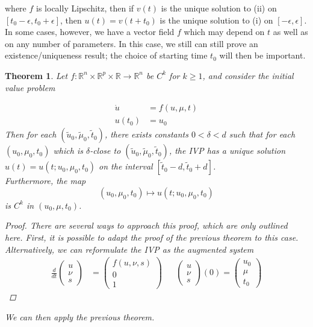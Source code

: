 \documentclass{article}
\newtheorem{theorem}{Theorem}[section]
\def\R{{\mathbb R}}
\begin{document}
where $f$ is locally Lipschitz, then if $v(t)$ is the unique solution to (ii) on $[t_0 - \epsilon, t_0 + \epsilon]$, then $u(t) = v(t+t_0)$ is the unique solution to (i) on $[-\epsilon, \epsilon]$.\\

In some cases, however, we have a vector field $f$ which may depend on $t$ as well as on any number of parameters. In this case, we still can still prove an existence/uniqueness result; the choice of starting time $t_0$ will then be important.


\begin{theorem}
Let $f: \R^n \times \R^p \times \R \rightarrow \R^n$ be $C^k$ for $k \geq 1$, and consider the initial value problem

\begin{align*}
\dot{u} &= f(u, \mu, t) \\
u(t_0) &= u_0
\end{align*} 
Then for each $(\tilde{u}_0, \tilde{\mu}_0, \tilde{t}_0)$, there exists constants $0 < \delta < d$ such that for each $(u_0, \mu_0, t_0)$ which is $\delta$-close to $(\tilde{u}_0, \tilde{\mu}_0, \tilde{t}_0)$, the IVP has a unique solution $u(t) = u(t; u_0, \mu_0, t_0)$ on the interval $[\tilde{t}_0 - d, \tilde{t}_0 + d]$.\\

Furthermore, the map
\[
(u_0, \mu_0, t_0) \mapsto u(t; u_0, \mu_0, t_0)
\]
is $C^k$ in $(u_0, \mu, t_0)$.
\begin{proof}
There are several ways to approach this proof, which are only outlined here. First, it is possible to adapt the proof of the previous theorem to this case. Alternatively, we can reformulate the IVP as the augmented system
\begin{align*}
\frac{d}{dt}\begin{pmatrix}u \\ \nu \\ s \end{pmatrix}
&= \begin{pmatrix}f(u, \nu, s) \\ 0 \\ 1 \end{pmatrix} &&
\begin{pmatrix}u \\ \nu \\ s \end{pmatrix}(0) = 
\begin{pmatrix}u_0 \\ \mu \\ t_0 \end{pmatrix}
\end{align*}
\end{proof}
We can then apply the previous theorem.
\end{theorem}
\end{document}
